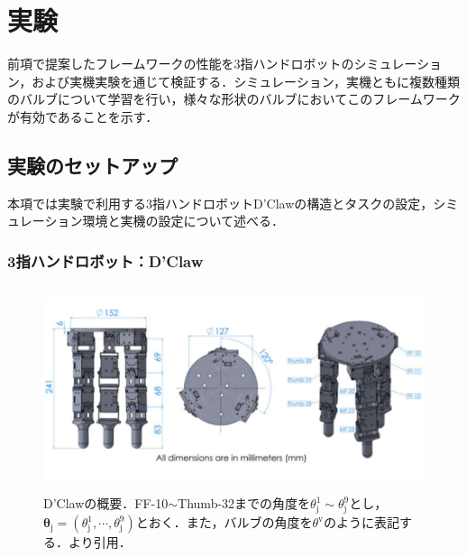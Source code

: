 \documentclass[dvipdfmx]{ampbt_nomag}
\begin{document}
\section{実験}\label{sec-experiment}
前項で提案したフレームワークの性能を3指ハンドロボットのシミュレーション，および実機実験を通じて検証する．シミュレーション，実機ともに複数種類のバルブについて学習を行い，様々な形状のバルブにおいてこのフレームワークが有効であることを示す．

\subsection{実験のセットアップ}
本項では実験で利用する3指ハンドロボットD'Clawの構造とタスクの設定，シミュレーション環境と実機の設定について述べる．

\subsubsection{3指ハンドロボット：D'Claw}
\begin{figure}[hbtp]
  \centering
  \includegraphics[height=6cm]
       {asset/img/dclaw.pdf}
  \caption{D'Clawの概要．FF-10$\sim$Thumb-32までの角度を$\theta^1_{\textrm{j}}\sim\theta^9_{\textrm{j}}$とし，$\boldsymbol{\theta}_{\textrm{j}}=(\theta^1_{\textrm{j}},\cdots,\theta^9_{\textrm{j}})$とおく．また，バルブの角度を$\theta^{\textrm{v}}$のように表記する．\cite{ahn2020robel}より引用．}
  \label{dclaw_structure}
\end{figure}
 
\end{document}
